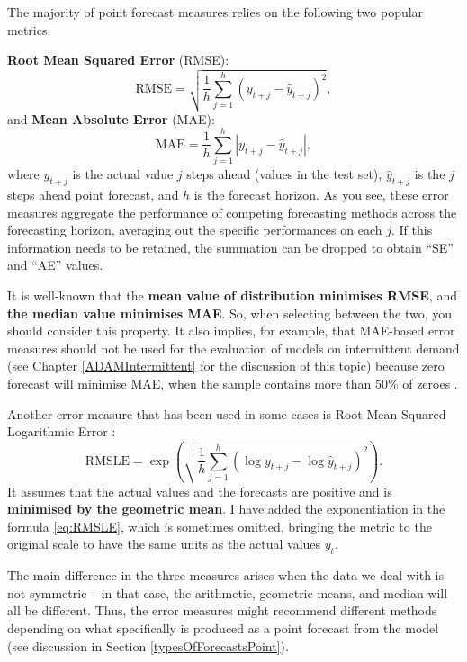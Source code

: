 \documentclass[]{book}
\theoremstyle{definition}
\theoremstyle{definition}
\theoremstyle{definition}
\theoremstyle{definition}
\theoremstyle{remark}
\begin{document}
The majority of point forecast measures relies on the following two popular metrics:

\textbf{Root Mean Squared Error} (RMSE):
\begin{equation}
    \mathrm{RMSE} = \sqrt{\frac{1}{h} \sum_{j=1}^h \left( y_{t+j} -\hat{y}_{t+j} \right)^2 },
    \label{eq:RMSE}
\end{equation}
and \textbf{Mean Absolute Error} (MAE):
\begin{equation}
    \mathrm{MAE} = \frac{1}{h} \sum_{j=1}^h \left| y_{t+j} -\hat{y}_{t+j} \right| ,
    \label{eq:MAE}
\end{equation}
where \(y_{t+j}\) is the actual value \(j\) steps ahead (values in the test set), \(\hat{y}_{t+j}\) is the \(j\) steps ahead point forecast, and \(h\) is the forecast horizon. As you see, these error measures aggregate the performance of competing forecasting methods across the forecasting horizon, averaging out the specific performances on each \(j\). If this information needs to be retained, the summation can be dropped to obtain ``SE'' and ``AE'' values.

It is well-known \citep[see, for example,][]{Kolassa2016} that the \textbf{mean value of distribution minimises RMSE}, and \textbf{the median value minimises MAE}. So, when selecting between the two, you should consider this property. It also implies, for example, that MAE-based error measures should not be used for the evaluation of models on intermittent demand (see Chapter \ref{ADAMIntermittent} for the discussion of this topic) because zero forecast will minimise MAE, when the sample contains more than 50\% of zeroes \citep[see, for example,][]{Wallstrom2010}.

Another error measure that has been used in some cases is Root Mean Squared Logarithmic Error \citep[RMSLE, see discussion in][]{Tofallis2015}:
\begin{equation}
    \mathrm{RMSLE} = \exp\left(\sqrt{\frac{1}{h} \sum_{j=1}^h \left( \log y_{t+j} -\log \hat{y}_{t+j} \right)^2} \right).
    \label{eq:RMSLE}
\end{equation}
It assumes that the actual values and the forecasts are positive and is \textbf{minimised by the geometric mean}. I have added the exponentiation in the formula \eqref{eq:RMSLE}, which is sometimes omitted, bringing the metric to the original scale to have the same units as the actual values \(y_t\).

The main difference in the three measures arises when the data we deal with is not symmetric -- in that case, the arithmetic, geometric means, and median will all be different. Thus, the error measures might recommend different methods depending on what specifically is produced as a point forecast from the model (see discussion in Section \ref{typesOfForecastsPoint}).
\end{document}
